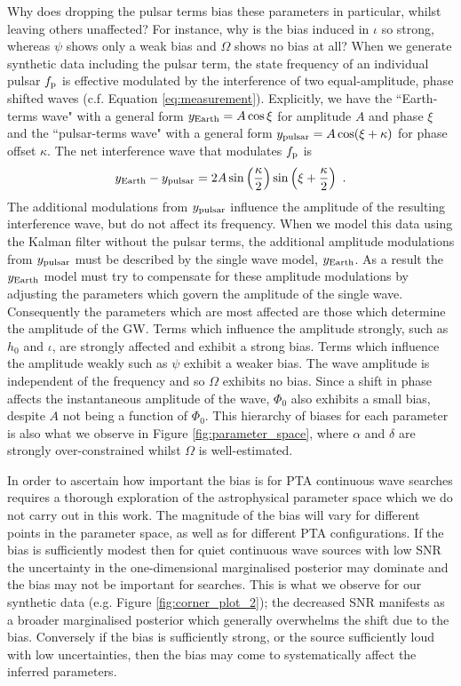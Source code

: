 \documentclass[fleqn,usenatbib,useAMS]{mnras}
\begin{document}
Why does dropping the pulsar terms bias these parameters in particular, whilst leaving others unaffected? For instance, why is the bias induced in $\iota$ so strong, whereas $\psi$ shows only a weak bias and  $\Omega$ shows no bias at all? When we generate synthetic data including the pulsar term, the state frequency of an individual pulsar $f_{\rm p}$ is effective modulated by the interference of two equal-amplitude, phase shifted waves (c.f. Equation \ref{eq:measurement}). Explicitly, we have the ``Earth-terms wave"	 with a general form $y_{\rm Earth} = A \cos \xi$ for amplitude $A$ and phase $\xi$ and the ``pulsar-terms wave" with a general form $y_{\rm pulsar} = A \cos (\xi + \kappa)$ for phase offset $\kappa$. The net interference wave that modulates $f_{\rm p}$ is 
\begin{eqnarray}
	y_{\rm Earth} - y_{\rm pulsar} = 2 A \sin \left(\frac{\kappa}{2}\right) \sin \left(\xi + \frac{\kappa}{2}\right) \ .
\end{eqnarray}
The additional modulations from $y_{\rm pulsar}$ influence the amplitude of the resulting interference wave, but do not affect its frequency. When we model this data using the Kalman filter without the pulsar terms, the additional amplitude modulations from $y_{\rm pulsar}$ must be described by the single wave model, $y_{\rm Earth}$. As a result the $y_{\rm Earth}$ model must try to compensate for these amplitude modulations by adjusting the parameters which govern the amplitude of the single wave. Consequently the parameters which are most affected are those which determine the amplitude of the GW. Terms which influence the amplitude strongly, such as $h_0$ and $\iota$, are strongly affected and exhibit a strong bias. Terms which influence the amplitude weakly such as $\psi$ exhibit a weaker bias. The wave amplitude is independent of the frequency and so $\Omega$ exhibits no bias. Since a shift in phase affects the instantaneous amplitude of the wave, $\Phi_0$ also exhibits a small bias, despite $A$ not being a function of $\Phi_0$. This hierarchy of biases for each parameter is also what we observe in Figure \ref{fig:parameter_space}, where $\alpha$ and $\delta$ are strongly over-constrained whilst $\Omega$ is well-estimated. \newline  

In order to ascertain how important the bias is for PTA continuous wave searches requires a thorough exploration of the astrophysical parameter space which we do not carry out in this work. The magnitude of the bias will vary for different points in the parameter space, as well as for different PTA configurations. If the bias is sufficiently modest then for quiet continuous wave sources with low SNR the uncertainty in the one-dimensional marginalised posterior may dominate and the bias may not be important for searches. This is what we observe for our synthetic data (e.g. Figure \ref{fig:corner_plot_2}); the decreased SNR manifests as a broader marginalised posterior which generally overwhelms the shift due to the bias. Conversely if the bias is sufficiently strong, or the source sufficiently loud with low uncertainties, then the bias may come to systematically affect the inferred parameters. \newline  
\end{document}
